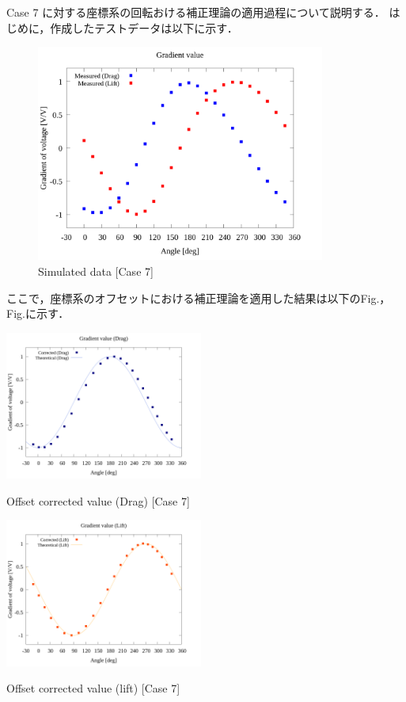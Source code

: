 Case 7 に対する座標系の回転おける補正理論の適用過程について説明する．
はじめに，作成したテストデータは以下に示す．

\begin{figure}[htbp]
    \footnotesize
    \begin{center}
        \includegraphics[width=95mm]{../../02_workspace/result/simulation_tx=10.0_ty=-5.0_dx=5.00_dy=-2.50/plot/05/05_summary-wave.png}
        \caption{Simulated data [Case 7]}
    \end{center}
\end{figure}

ここで，座標系のオフセットにおける補正理論を適用した結果は以下のFig.，Fig.に示す．

\begin{multicols}{2}
    \begin{figure_here}
        \begin{center}
        \includegraphics[width=65mm]{../../02_workspace/result/simulation_tx=10.0_ty=-5.0_dx=5.00_dy=-2.50/plot/21/21-2_corrected_offset_drag.png}
        \caption{Offset corrected value (Drag) [Case 7]}
        \includegraphics[width=65mm]{../../02_workspace/result/simulation_tx=10.0_ty=-5.0_dx=5.00_dy=-2.50/plot/21/21-2_corrected_offset_lift.png}
        \caption{Offset corrected value (lift) [Case 7]}
        \end{center}
    \end{figure_here}
\end{multicols}

